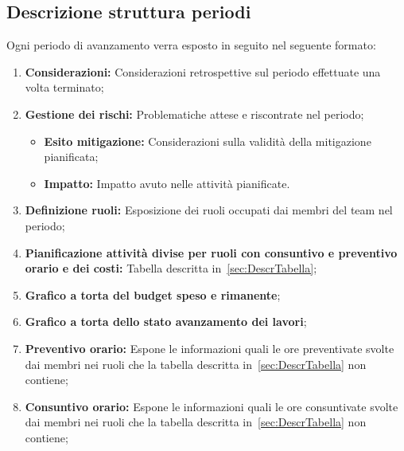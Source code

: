 \subsection{Descrizione struttura periodi}
Ogni periodo di avanzamento verra esposto in seguito nel seguente formato:
\begin{enumerate}
    \item \textbf{Considerazioni:} Considerazioni retrospettive sul periodo effettuate una volta terminato;
    \item \textbf{Gestione dei rischi:} Problematiche attese e riscontrate nel periodo;
        \begin{itemize}
            \item \textbf{Esito mitigazione:} Considerazioni sulla validità della mitigazione pianificata;
            \item \textbf{Impatto:} Impatto avuto nelle attività pianificate.
        \end{itemize}
    \item \textbf{Definizione ruoli:} Esposizione dei ruoli occupati dai membri del team nel periodo;
    \item \textbf{Pianificazione attività divise per ruoli con consuntivo e preventivo orario e dei costi:} Tabella descritta in~\ref{sec:DescrTabella};
    \item \textbf{Grafico a torta del budget speso e rimanente};
    \item \textbf{Grafico a torta dello stato avanzamento dei lavori};
    \item \textbf{Preventivo orario:} Espone le informazioni quali le ore preventivate svolte dai membri nei ruoli che la tabella descritta in~\ref{sec:DescrTabella} non contiene;
    \item \textbf{Consuntivo orario:} Espone le informazioni quali le ore consuntivate svolte dai membri nei ruoli che la tabella descritta in~\ref{sec:DescrTabella} non contiene;


\end{enumerate}
